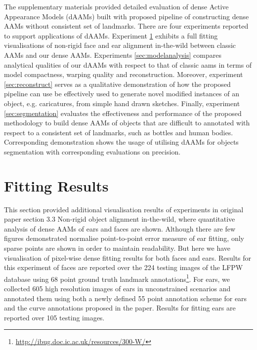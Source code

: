 The supplementary materials provided detailed evaluation of dense Active Appearance Models (dAAMs) built with proposed pipeline of constructing dense AAMs without consistent set of landmarks. There are four experiments reported to support applications of dAAMs. Experiment \ref{sec:fittingresults} exhibits a full fitting visualisations of non-rigid face and ear alignment in-the-wild between classic AAMs and our dense AAMs. Experiments \ref{sec:modelanalysis} compares analytical qualities of our dAAMs with respect to that of classic aams in terms of model compactness, warping quality and reconstruction.
Moreover, experiment \ref{sec:reconstruct} serves as a qualitative demonstration of how the proposed pipeline can use be effectively used to generate novel modified instances of an object, e.g. caricatures, from simple hand drawn sketches.
Finally, experiment \ref{sec:segmentation} evaluates the effectiveness and performance of the proposed methodology to build dense AAMs of objects that are difficult to annotated with respect to a consistent set of landmarks, such as bottles and human bodies. Corresponding demonstration shows the usage of utilising dAAMs for objects segmentation with corresponding evaluations on precision.

\appendix
\section{Fitting Results}
\label{sec:fittingresults}



This section provided additional visualisation results of experiments in original paper section 3.3 Non-rigid object alignment in-the-wild, where quantitative analysis of dense AAMs of ears and faces are shown. Although there are few figures demonstrated normalise point-to-point error measure of ear fitting, only sparse points are shown in order to maintain readability. But here we have visualisation of pixel-wise dense fitting results for both faces and ears. Results for this experiment of faces are reported over the 224
testing images of the LFPW database using 68 point ground truth landmark annotations\footnote{\label{ibug_300} \url{http://ibug.doc.ic.ac.uk/resources/300-W/}}. For ears, we collected 605 high resolution images of ears in unconstrained scenarios and annotated them using both a newly defined 55 point annotation scheme for ears and the curve annotations proposed in the paper. Results for fitting ears are reported over 105 testing images.

